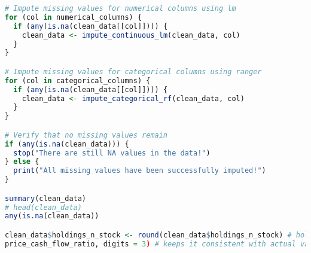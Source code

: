 \begin{lstlisting}[language=R, breaklines=true, basicstyle=\ttfamily\small, columns=fullflexible]
# Impute missing values for numerical columns using lm
for (col in numerical_columns) {
  if (any(is.na(clean_data[[col]]))) {
    clean_data <- impute_continuous_lm(clean_data, col)
  }
}

# Impute missing values for categorical columns using ranger
for (col in categorical_columns) {
  if (any(is.na(clean_data[[col]]))) {
    clean_data <- impute_categorical_rf(clean_data, col)
  }
}

# Verify that no missing values remain
if (any(is.na(clean_data))) {
  stop("There are still NA values in the data!")
} else {
  print("All missing values have been successfully imputed!")
}

summary(clean_data)
# head(clean_data)
any(is.na(clean_data))

clean_data$holdings_n_stock <- round(clean_data$holdings_n_stock) # holdings_n_stock is an integer value
price_cash_flow_ratio, digits = 3) # keeps it consistent with actual values

\end{lstlisting}

